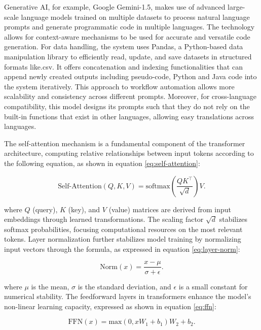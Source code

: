 \documentclass{dhbenelux}
\begin{document}
Generative AI, for example, Google Gemini-1.5, makes use of advanced large-scale language models trained on multiple datasets to process natural language prompts and generate programmatic code in multiple languages. The technology allows for context-aware mechanisms to be used for accurate and versatile code generation. For data handling, the system uses Pandas, a Python-based data manipulation library to efficiently read, update, and save datasets in structured formats like.csv. It offers concatenation and indexing functionalities that can append newly created outputs including pseudo-code, Python and Java code into the system iteratively. This approach to workflow automation allows more scalability and consistency across different prompts. Moreover, for cross-language compatibility, this model designs its prompts such that they do not rely on the built-in functions that exist in other languages, allowing easy translations across languages.

The self-attention mechanism is a fundamental component of the transformer architecture, computing relative relationships between input tokens according to the following equation, as shown in equation \ref{eq:self-attention}:

\begin{equation}
\text{Self-Attention}(Q, K, V) = \text{softmax}\left(\frac{QK^\top}{\sqrt{d}}\right)V.
\label{eq:self-attention}
\end{equation}

where \( Q \) (query), \( K \) (key), and \( V \) (value) matrices are derived from input embeddings through learned transformations. The scaling factor \( \sqrt{d} \) stabilizes softmax probabilities, focusing computational resources on the most relevant tokens. Layer normalization further stabilizes model training by normalizing input vectors through the formula, as expressed in equation \ref{eq:layer-norm}:

\begin{equation}
\text{Norm}(x) = \frac{x - \mu}{\sigma + \epsilon}.
\label{eq:layer-norm}
\end{equation}

where \( \mu \) is the mean, \( \sigma \) is the standard deviation, and \( \epsilon \) is a small constant for numerical stability. The feedforward layers in transformers enhance the model’s non-linear learning capacity, expressed as shown in equation \ref{eq:ffn}:

\begin{equation}
\text{FFN}(x) = \text{max}(0, xW_1 + b_1)W_2 + b_2.
\label{eq:ffn}
\end{equation}
\end{document}
